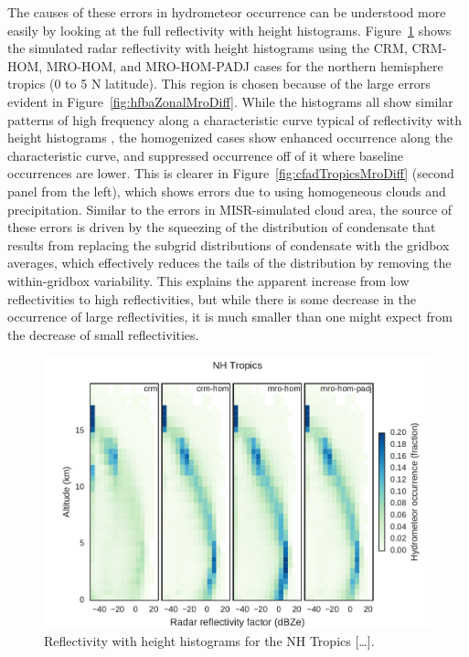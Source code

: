 The causes of these errors in hydrometeor occurrence can be understood
more easily by looking at the full reflectivity with height histograms.
Figure~\ref{fig:cfadTropicsMro} shows the simulated radar reflectivity
with height histograms using the CRM, CRM-HOM, MRO-HOM, and MRO-HOM-PADJ
cases for the northern hemisphere tropics (0 to 5 N latitude). This
region is chosen because of the large errors evident in
Figure~\ref{fig:hfbaZonalMroDiff}. While the histograms all show similar
patterns of high frequency along a characteristic curve typical of
reflectivity with height histograms
\citep[e.g.,][]{marchand_et_al_2009}, the homogenized cases show
enhanced occurrence along the characteristic curve, and suppressed
occurrence off of it where baseline occurrences are lower. This is
clearer in Figure~\ref{fig:cfadTropicsMroDiff} (second panel from the
left), which shows errors due to using homogeneous clouds and
precipitation. Similar to the errors in MISR-simulated cloud area, the
source of these errors is driven by the squeezing of the distribution of
condensate that results from replacing the subgrid distributions of
condensate with the gridbox averages, which effectively reduces the
tails of the distribution by removing the within-gridbox variability.
This explains the apparent increase from low reflectivities to high
reflectivities, but while there is some decrease in the occurrence of
large reflectivities, it is much smaller than one might expect from the
decrease of small reflectivities.

\begin{figure}[htbp]
\centering
\includegraphics{graphics/subgrid1_cfadDbze94_NHTropics.pdf}
\caption{\label{fig:cfadTropicsMro}Reflectivity with height histograms
for the NH Tropics {[}\ldots{}{]}.}\label{fig:cfadTropicsMro}
\end{figure}

